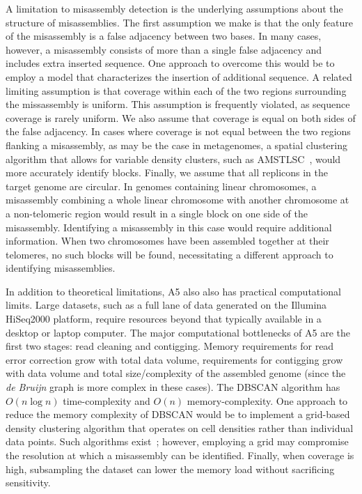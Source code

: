 \documentclass{bioinfo}
\begin{document}
A limitation to misassembly detection is the underlying assumptions about the structure of misassemblies. The first assumption we make
is that the only feature of the misassembly is a false adjacency between two bases.
In many cases, however, a misassembly consists of more than a single false adjacency and includes extra inserted sequence.  One approach to
overcome this would be to employ a model that characterizes the insertion of additional sequence. A related limiting assumption is 
that coverage within each of the two regions surrounding the missassembly is uniform. This assumption is frequently violated, as sequence coverage
is rarely uniform. We also assume that coverage is equal on both sides of the false adjacency. In cases where coverage is not equal between 
the two regions flanking a misassembly, as may be the case in metagenomes, a spatial clustering algorithm that allows for variable density
clusters, such as AMSTLSC~\citep{AMSTLSC}, would more accurately identify blocks. Finally, we assume that all replicons in the target genome
are circular. In genomes containing linear chromosomes, a misassembly combining a whole linear chromosome with another chromosome
at a non-telomeric region would result in a single block on one side of the misassembly. Identifying a misassembly in this case
would require additional information. When two chromosomes have been assembled together at their telomeres, no such blocks will be found, 
necessitating a different approach to identifying misassemblies.

In addition to theoretical limitations, A5 also also has practical computational limits. Large datasets, such as a full lane of data
generated on the Illumina HiSeq2000 platform, require resources beyond that typically available in a desktop or laptop computer. 
The major computational bottlenecks of A5 are the first two stages: read cleaning and contigging. Memory requirements for read error
correction grow with total data volume, requirements for contigging grow with data volume and total size/complexity of the assembled genome 
(since the \textit{de Bruijn} graph is more complex in these cases).
The DBSCAN algorithm has $O(n\log{n})$ time-complexity and $O(n)$ memory-complexity. One 
approach to reduce the memory complexity of DBSCAN would be to implement a grid-based density clustering algorithm that operates on cell densities 
rather than individual data points. Such algorithms exist~\citep{STING}; however, employing a grid may compromise the resolution at which 
a misassembly can be identified. Finally, when coverage is high, subsampling the dataset can lower the memory load without sacrificing
sensitivity.
\end{document}

